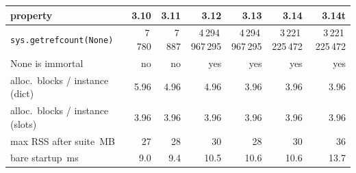 \begin{tabular}{lrrrrrr}
\toprule
property & 3.10 & 3.11 & 3.12 & 3.13 & 3.14 & 3.14t \\
\midrule
\texttt{sys.getrefcount(None)} & 7\,780 & 7\,887 & 4\,294\,967\,295 & 4\,294\,967\,295 & 3\,221\,225\,472 & 3\,221\,225\,472 \\
None is immortal & no & no & yes & yes & yes & yes \\
alloc.\ blocks / instance (dict) & 5.96 & 4.96 & 4.96 & 3.96 & 3.96 & 3.96 \\
alloc.\ blocks / instance (slots) & 3.96 & 3.96 & 3.96 & 3.96 & 3.96 & 3.96 \\
max RSS after suite\, MB & 27 & 28 & 30 & 28 & 30 & 36 \\
bare startup\, ms & 9.0 & 9.4 & 10.5 & 10.6 & 10.6 & 13.7 \\
\bottomrule
\end{tabular}
